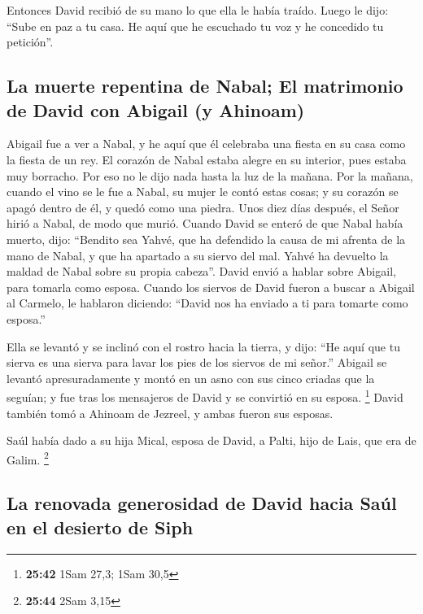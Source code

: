  Entonces David recibió de su mano lo que ella le había
traído. Luego le dijo: ``Sube en paz a tu casa. He aquí que he escuchado
tu voz y he concedido tu petición''.

\hypertarget{la-muerte-repentina-de-nabal-el-matrimonio-de-david-con-abigail-y-ahinoam}{%
\subsection{La muerte repentina de Nabal; El matrimonio de David con
Abigail (y
Ahinoam)}\label{la-muerte-repentina-de-nabal-el-matrimonio-de-david-con-abigail-y-ahinoam}}

 Abigail fue a ver a Nabal, y he aquí que él celebraba
una fiesta en su casa como la fiesta de un rey. El corazón de Nabal
estaba alegre en su interior, pues estaba muy borracho. Por eso no le
dijo nada hasta la luz de la mañana.  Por la mañana,
cuando el vino se le fue a Nabal, su mujer le contó estas cosas; y su
corazón se apagó dentro de él, y quedó como una piedra. 
Unos diez días después, el Señor hirió a Nabal, de modo que murió.
 Cuando David se enteró de que Nabal había muerto, dijo:
``Bendito sea Yahvé, que ha defendido la causa de mi afrenta de la mano
de Nabal, y que ha apartado a su siervo del mal. Yahvé ha devuelto la
maldad de Nabal sobre su propia cabeza''. David envió a hablar sobre
Abigail, para tomarla como esposa.  Cuando los siervos de
David fueron a buscar a Abigail al Carmelo, le hablaron diciendo:
``David nos ha enviado a ti para tomarte como esposa.''

 Ella se levantó y se inclinó con el rostro hacia la
tierra, y dijo: ``He aquí que tu sierva es una sierva para lavar los
pies de los siervos de mi señor.''  Abigail se levantó
apresuradamente y montó en un asno con sus cinco criadas que la seguían;
y fue tras los mensajeros de David y se convirtió en su esposa.
\footnote{\textbf{25:42} 1Sam 27,3; 1Sam 30,5}  David
también tomó a Ahinoam de Jezreel, y ambas fueron sus esposas.

 Saúl había dado a su hija Mical, esposa de David, a
Palti, hijo de Lais, que era de Galim. \footnote{\textbf{25:44} 2Sam
  3,15}

\hypertarget{la-renovada-generosidad-de-david-hacia-sauxfal-en-el-desierto-de-siph}{%
\subsection{La renovada generosidad de David hacia Saúl en el desierto
de
Siph}\label{la-renovada-generosidad-de-david-hacia-sauxfal-en-el-desierto-de-siph}}

